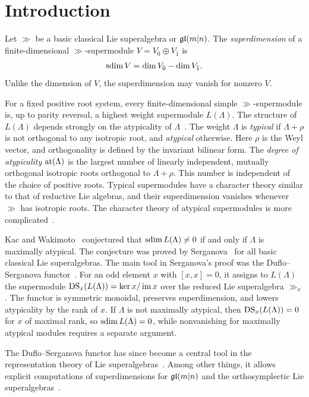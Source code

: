 \section{Introduction}
\noindent
Let $\gg$ be a basic classical Lie superalgebra or ${\mathfrak{gl}}(m\vert n)$. The \emph{superdimension} of a finite-dimensional $\gg$-supermodule $V=V_{\bar0}\oplus V_{\bar1}$ is
\begin{equation*}
\operatorname{sdim} V=\dim V_{\bar0}-\dim V_{\bar1}.
\end{equation*}
Unlike the dimension of $V$, the superdimension may vanish for nonzero $V$.

For a fixed positive root system, every finite-dimensional simple $\gg$-supermodule is, up to parity reversal, a highest weight supermodule $L(\Lambda)$. The structure of $L(\Lambda)$ depends strongly on the atypicality of $\Lambda$~\cite{Kac,Kac_classification}. The weight $\Lambda$ is \emph{typical} if $\Lambda+\rho$ is not orthogonal to any isotropic root, and \emph{atypical} otherwise. Here $\rho$ is the Weyl vector, and orthogonality is defined by the invariant bilinear form. The \emph{degree of atypicality} ${\operatorname{at}}(\Lambda)$ is the largest number of linearly independent, mutually orthogonal isotropic roots orthogonal to $\Lambda+\rho$. This number is independent of the choice of positive roots. Typical supermodules have a character theory similar to that of reductive Lie algebras, and their superdimension vanishes whenever $\gg$ has isotropic roots. The character theory of atypical supermodules is more complicated~\cite{Serganova1996,Brundan2003,GrusonSerganova2010}. 

Kac and Wakimoto~\cite{kac1994integrable} conjectured that $\operatorname{sdim} L(\Lambda)\neq0$ if and only if $\Lambda$ is maximally atypical. The conjecture was proved by Serganova~\cite{serganova2011superdimension}
for all basic classical Lie superalgebras. The main tool in Serganova's proof was the Duflo--Serganova functor~\cite{duflo2005associated}. For an odd element $x$ with $[x,x]=0$, it assigns to $L(\Lambda)$ the supermodule $\operatorname{DS}_x(L(\Lambda))=\ker x/\operatorname{im}x$ over the reduced Lie superalgebra $\gg_x$. The functor is symmetric monoidal, preserves superdimension, and lowers atypicality by the rank of $x$. If $\Lambda$ is not maximally atypical, then $\operatorname{DS}_x(L(\Lambda))=0$ for $x$ of maximal rank, so $\operatorname{sdim} L(\Lambda)=0$, while nonvanishing for maximally atypical modules requires a separate argument.

The Duflo--Serganova functor has since become a central tool in the
representation theory of Lie superalgebras~\cite{gorelik2022duflo}. Among
other things, it allows explicit computations of superdimensions for
${\mathfrak{gl}}(m\vert n)$ and the orthosymplectic Lie
superalgebras~\cite{heidersdorf2021cohomological,GorelikHeidersdorf2022semisimplicity,GorelikHeidersdorfCharacter}.

